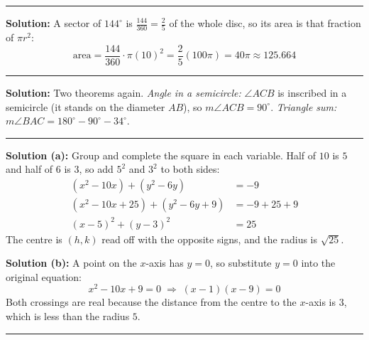 \documentclass[12pt]{article}
\begin{document}
\vspace{0.2cm}\noindent\rule{\linewidth}{0.2pt}


\textbf{Solution:} A sector of $144^\circ$ is $\tfrac{144}{360} = \tfrac{2}{5}$ of the
whole disc, so its area is that fraction of $\pi r^2$:
\[
  \text{area} = \frac{144}{360}\cdot \pi (10)^2 = \frac{2}{5}(100\pi) = 40\pi \approx 125.664
\]

\vspace{0.2cm}\noindent\rule{\linewidth}{0.2pt}


\textbf{Solution:} Two theorems again.
\emph{Angle in a semicircle:} $\angle ACB$ is inscribed in a semicircle (it stands on
the diameter $AB$), so $m\angle ACB = 90^\circ$.
\emph{Triangle sum:} $m\angle BAC = 180^\circ - 90^\circ - 34^\circ$.

\vspace{0.2cm}\noindent\rule{\linewidth}{0.2pt}


\textbf{Solution (a):} Group and complete the square in each variable. Half of $10$
is $5$ and half of $6$ is $3$, so add $5^2$ and $3^2$ to both sides:
\begin{align*}
  (x^2 - 10x) + (y^2 - 6y) &= -9 \\
  (x^2 - 10x + 25) + (y^2 - 6y + 9) &= -9 + 25 + 9 \\
  (x - 5)^2 + (y - 3)^2 &= 25
\end{align*}
The centre is $(h,k)$ read off with the opposite signs, and the radius is
$\sqrt{25}$.

\textbf{Solution (b):} A point on the $x$-axis has $y = 0$, so substitute $y = 0$
into the original equation:
\[ x^2 - 10x + 9 = 0 \;\Longrightarrow\; (x - 1)(x - 9) = 0 \]
Both crossings are real because the distance from the centre to the $x$-axis is
$3$, which is less than the radius $5$.

\vspace{0.2cm}\noindent\rule{\linewidth}{0.2pt}
\end{document}
